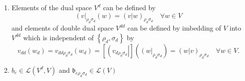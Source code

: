 \documentclass[aps,preprint]{revtex4}
\begin{document}
\begin{enumerate}
\item Elements of the dual space $V^{d}$ can be defined by 
\begin{equation}
\left( v\right\vert _{\rho _{d}\sigma _{d}}\left( w\right) =\left( \left.
v\right\vert w\right) _{\rho _{d}\sigma _{d}}\quad \forall w\in V
\end{equation}%
and elements of double dual space $V^{dd}$ can be defined by imbedding of $V$
into $V^{dd}$ which is independent of $\left\{ \rho _{d},\sigma _{d}\right\} 
$ by 
\begin{equation}
v_{dd}\left( w_{d}\right) =v_{dd\rho _{d}\sigma _{d}}\left( w_{d}\right) = 
\left[ \left( \overset{}{v_{d\rho _{d}\sigma _{d}}}\right\vert \right]
\left( \left( \overset{}{w}\right\vert _{\rho _{d}\sigma _{d}}\right)
=\left( \left. w\right\vert v\right) _{\rho _{d}\sigma _{d}}\quad \forall
w\in V.
\end{equation}

\item $b_{e}\in \mathcal{L}\left( V^{d},V\right) $ and $\mathfrak{b}_{e\rho
_{d}\sigma _{d}}\in \mathcal{L}\left( V\right) $


\end{enumerate}
\end{document}
